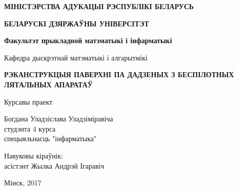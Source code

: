 \begin{titlepage}
    \begin{center}
        {\bf МІНІСТЭРСТВА АДУКАЦЫІ РЭСПУБЛІКІ БЕЛАРУСЬ}
    \end{center}
    \begin{center}
        {\bf БЕЛАРУСКІ ДЗЯРЖАЎНЫ УНІВЕРСІТЭТ}
    \end{center}
    \begin{center}
        {\bf Факультэт прыкладной матэматыкі і інфарматыкі}
    \end{center}
    \begin{center}
        Кафедра дыскрэтнай матэматыкі і алгарытмікі
    \end{center}

    \vspace{8em}

    \begin{center}
        {\bf РЭКАНСТРУКЦЫЯ ПАВЕРХНІ ПА ДАДЗЕНЫХ З БЕСПІЛОТНЫХ ЛЯТАЛЬНЫХ АПАРАТАЎ}
    \end{center}

    \vspace{2em}

    \begin{center}
        Курсавы праект
    \end{center}

    \vspace{3em}

    \begin{flushright}
        Богдана Уладзіслава Уладзіміравіча\\
        студэнта 4 курса\\
        спецыяльнасць "інфарматыка"\\
    \end{flushright}

    \vspace{1em}

    \begin{flushright}
        Навуковы кіраўнік:\\
        асістэнт Жылка Андрэй Ігаравіч \\
    \end{flushright}

    \vfill

    \begin{center}
        Мінск, 2017
    \end{center}
\end{titlepage}
\newpage
